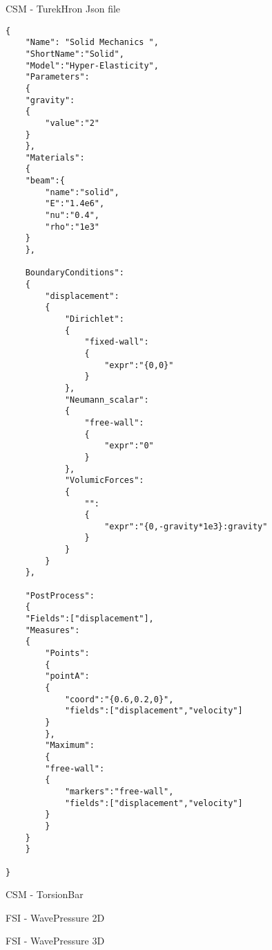 \begin{frame}[fragile]{CSM - TurekHron}
Json file

\begin{lstlisting}
{
    "Name": "Solid Mechanics ",
    "ShortName":"Solid",
    "Model":"Hyper-Elasticity",
    "Parameters":
    {
	"gravity":
	{
	    "value":"2"
	}
    },
    "Materials":
    {
	"beam":{
	    "name":"solid",
	    "E":"1.4e6",
	    "nu":"0.4",
	    "rho":"1e3"
	}
    },

    BoundaryConditions":
    {
        "displacement":
        {
            "Dirichlet":
            {
                "fixed-wall":
                {
                    "expr":"{0,0}"
                }
            },
            "Neumann_scalar":
            {
                "free-wall":
                {
                    "expr":"0" 
                }
            },
            "VolumicForces":
            {
                "":
                {
                    "expr":"{0,-gravity*1e3}:gravity" 
                }
            }
        }
    },

    "PostProcess":
    {
	"Fields":["displacement"],
	"Measures":
	{
	    "Points":
	    {
		"pointA":
		{
		    "coord":"{0.6,0.2,0}",
		    "fields":["displacement","velocity"]
		}
	    },
	    "Maximum":
	    {
		"free-wall":
		{
		    "markers":"free-wall",
		    "fields":["displacement","velocity"]
		}
	    }
	}
    }

}
\end{lstlisting}

\end{frame}

\begin{frame}[fragile]{CSM - TorsionBar}

\end{frame}

\begin{frame}[fragile]{ FSI - WavePressure 2D}

\end{frame}

\begin{frame}[fragile]{ FSI - WavePressure 3D}

\end{frame}


